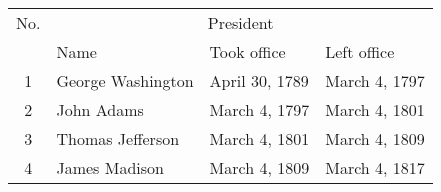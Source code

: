 \begin{tabular}{c|lll}
	No. & \multicolumn{3}{|c}{President}\\
	    & Name & Took office & Left office\\
	\hline
	1 & George Washington & April 30, 1789 & March 4, 1797\\
	2 & John Adams & March 4, 1797 & March 4, 1801\\
	3 & Thomas Jefferson & March 4, 1801 & March 4, 1809\\
	4 & James Madison & March 4, 1809 & March 4, 1817\\
\end{tabular}
